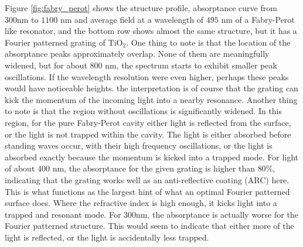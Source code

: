 Figure \ref{fig:fabry_perot} shows the structure profile, absorptance curve from $300 \text{nm}$ to $1100$ nm and average field at a wavelength of $495$ nm of a Fabry-Perot like resonator, and the bottom row shows almost the same structure, but it has a Fourier patterned grating of TiO$_2$.
One thing to note is that the location of the absorptance peaks approximately overlap. None of them are meaningfully widened, but for about $800$ nm, the spectrum starts to exhibit smaller peak oscillations. If the wavelength resolution were even higher, perhaps these peaks would have noticeable heights.
the interpretation is of course that the grating can kick the momentum of the incoming light into a nearby resonance. Another thing to note is that the region without oscillations is significantly widened. In this region, for the pure Fabry-Perot cavity either light is reflected from the surface, or the light is not trapped within the cavity.
The light is either absorbed before standing waves occur, with their high frequency oscillations, or the light is absorbed exactly because the momentum is kicked into a trapped mode. For light of about 400 nm, the absorptance for the given grating is higher than $80\%$, indicating that the grating works well as an anti-reflective coating (ARC) here. This is what functions as the largest hint of what an optimal Fourier patterned surface does.
Where the refractive index is high enough, it kicks light into a trapped and resonant mode. For 300nm, the absorptance is actually worse for the Fourier patterned structure. This  would seem to indicate that either more of the light is reflected, or the light is accidentally less trapped.   

